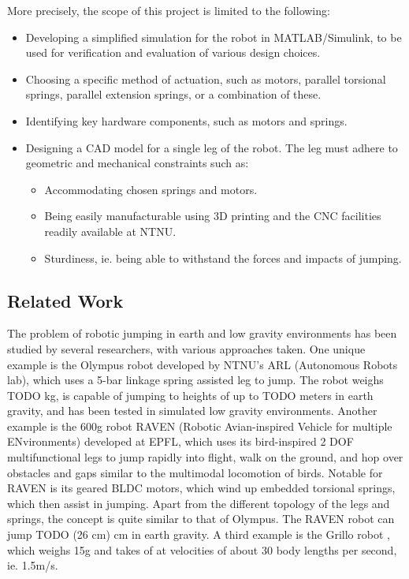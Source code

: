 More precisely, the scope of this project is limited to the following:
\begin{itemize}
    \item Developing a simplified simulation for the robot in MATLAB/Simulink, to be used for verification and evaluation of various design choices. 
    \item Choosing a specific method of actuation, such as motors, parallel torsional springs, parallel extension springs, or a combination of these.
    \item Identifying key hardware components, such as motors and springs. 
    \item Designing a CAD model for a single leg of the robot. The leg must adhere to geometric and mechanical constraints such as:
    \begin{itemize}
    \item Accommodating chosen springs and motors. 
    \item Being easily manufacturable using 3D printing and the CNC facilities readily available at NTNU.
    \item Sturdiness, ie. being able to withstand the forces and impacts of jumping. 
    \end{itemize}
\end{itemize}

\subsection{Related Work}
\label{sec:related_work}

The problem of robotic jumping in earth and low gravity environments has been studied by several researchers, with various approaches taken. One unique example is the Olympus robot \cite{OLYMPUS1} \cite{OLYMPUS2} developed by NTNU's ARL (Autonomous Robots lab), which uses a 5-bar linkage spring assisted leg to jump. The robot weighs TODO kg, is capable of jumping to heights of up to TODO meters in earth gravity, and has been tested in simulated low gravity environments. Another example is the 600g robot RAVEN (Robotic Avian-inspired Vehicle for multiple ENvironments) \cite{RAVEN} developed at EPFL, which uses its bird-inspired 2 DOF multifunctional legs to jump rapidly into flight, walk on the ground, and hop over obstacles and gaps similar to the multimodal locomotion of birds. Notable for RAVEN is its geared BLDC motors, which wind up embedded torsional springs, which then assist in jumping. Apart from the different topology of the legs and springs, the concept is quite similar to that of Olympus. The RAVEN robot can jump TODO (26 cm) cm in earth gravity. A third example is the Grillo robot \cite{GRILLO}, which weighs 15g and takes of at velocities of about 30 body lengths per second, ie. 1.5m/s. 

